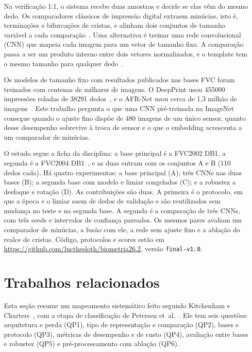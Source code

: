 \documentclass[conference]{IEEEtran}
\newcommand{\repourl}{\url{https://github.com/lucthesloth/biometria26.2}}
\newcommand{\repoversion}{final-v1.0}
\begin{document}
Na verificação 1:1, o sistema recebe duas amostras e decide se elas vêm do mesmo dedo. Os comparadores clássicos de impressão digital extraem minúcias, isto é, terminações e bifurcações de cristas, e alinham dois conjuntos de tamanho variável a cada comparação~\cite{jain1997online,cappelli2010mcc,maltoni2022handbook}. Uma alternativa é treinar uma rede convolucional (CNN) que mapeia cada imagem para um vetor de tamanho fixo. A comparação passa a ser um produto interno entre dois vetores normalizados, e o template tem o mesmo tamanho para qualquer dedo~\cite{engelsma2021deepprint}.

Os modelos de tamanho fixo com resultados publicados nas bases FVC foram treinados com centenas de milhares de imagens. O DeepPrint usou \num{455000} impressões roladas de \num{38291} dedos~\cite{engelsma2021deepprint}, e o AFR-Net usou cerca de 1,3 milhão de imagens~\cite{grosz2024afrnet}. Este trabalho pergunta o que uma CNN pré-treinada na ImageNet~\cite{deng2009imagenet} consegue quando o ajuste fino dispõe de 480 imagens de um único sensor, quanto desse desempenho sobrevive à troca de sensor e o que o embedding acrescenta a um comparador de minúcias.

O estudo segue a ficha da disciplina: a base principal é a FVC2002 DB1, a segunda é a FVC2004 DB1~\cite{maio2002fvc2002,maio2004fvc2004}, e as duas entram com os conjuntos A e B (110 dedos cada). Há quatro experimentos: a base principal (A); três CNNs nas duas bases (B); a segunda base com modelo e limiar congelados (C); e a robustez a desfoque e rotação (D). As contribuições são duas. A primeira é o protocolo, em que a época e o limiar saem de dedos de validação e são reutilizados sem mudança no teste e na segunda base. A segunda é a comparação de três CNNs, com três seeds e intervalos de confiança pareados. Os mesmos pares avaliam um comparador de minúcias, a fusão com ele, a rede sem ajuste fino e a ablação do realce de cristas. Código, protocolos e scores estão em \repourl, versão \texttt{\repoversion}.

\section{Trabalhos relacionados}
\label{sec:relacionados}
Esta seção resume um mapeamento sistemático feito segundo Kitchenham e Charters~\cite{kitchenham2007guidelines}, com a etapa de classificação de Petersen et~al.~\cite{petersen2015guidelines}. Ele tem seis questões: arquitetura e perda (QP1), tipo de representação e comparação (QP2), bases e protocolo (QP3), métricas de desempenho e de custo (QP4), avaliação entre bases e robustez (QP5) e pré-processamento com ablação (QP6).
\end{document}
